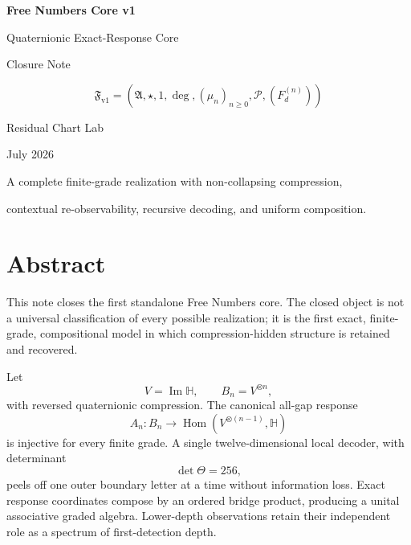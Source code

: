 \documentclass[11pt,a4paper]{article}
\newcommand{\Hq}{\mathbb H}
\newcommand{\Fn}{\mathfrak F_{\mathrm{v1}}}
\newcommand{\An}{\mathfrak A}
\newcommand{\st}{\star}
\newcommand{\Hom}{\operatorname{Hom}}
\newcommand{\degf}{\operatorname{deg}}
\begin{document}
\begin{titlepage}
\thispagestyle{empty}
\centering
\vspace*{18mm}

{\Huge\bfseries\color{deepblue} Free Numbers Core v1\par}
\vspace{4mm}
{\LARGE Quaternionic Exact-Response Core\par}
\vspace{4mm}
{\large Closure Note\par}

\vspace{18mm}

\begin{tcolorbox}[
  width=0.88\textwidth,
  colback=softblue,
  colframe=deepblue,
  boxrule=0.9pt,
  arc=2mm,
  left=5mm,right=5mm,top=6mm,bottom=6mm
]
\centering
\[
\boxed{
\Fn
=
\left(
\An,
\st,
1,
\degf,
(\mu_n)_{n\ge0},
\mathcal P,
(F_d^{(n)})
\right)
}
\]
\end{tcolorbox}

\vfill

{\large Residual Chart Lab\par}
\vspace{2mm}
{\normalsize July 2026\par}

\vspace{15mm}
{\small
A complete finite-grade realization with non-collapsing compression,\par
contextual re-observability, recursive decoding, and uniform composition.\par
}
\end{titlepage}

\tableofcontents
\newpage

\section*{Abstract}

This note closes the first standalone Free Numbers core. The closed object is not a universal classification of every possible realization; it is the first exact, finite-grade, compositional model in which compression-hidden structure is retained and recovered.

Let
\[
V=\operatorname{Im}\Hq,
\qquad
B_n=V^{\otimes n},
\]
with reversed quaternionic compression. The canonical all-gap response
\[
A_n:B_n\longrightarrow \Hom(V^{\otimes(n-1)},\Hq)
\]
is injective for every finite grade. A single twelve-dimensional local decoder, with determinant
\[
\det\Theta=256,
\]
peels off one outer boundary letter at a time without information loss. Exact response coordinates compose by an ordered bridge product, producing a unital associative graded algebra. Lower-depth observations retain their independent role as a spectrum of first-detection depth.
\end{document}
